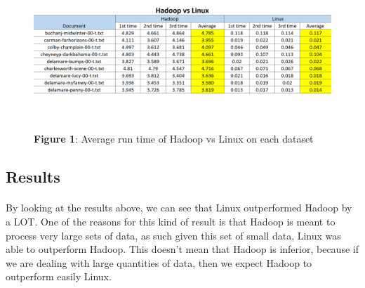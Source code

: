 \documentclass[12pt]{article}
\begin{document}
	\begin{figure}[H]
	\centering
	\includegraphics[width=160mm, height=60mm, scale=1.0]{images/Hadoop_vs_Linux_table.PNG}
	\caption*{\textbf{Figure 1}: Average run time of Hadoop vs Linux on each dataset}
	\end{figure}

	\subsection{Results}
        \paragraph{} By looking at the results above, we can see that Linux outperformed Hadoop 
		by a LOT. One of the reasons for this kind of result is that Hadoop is meant to process 
		very large sets of data, as such given this set of small data, Linux was able to outperform 
		Hadoop. This doesn't mean that Hadoop is inferior, because if we are dealing with large quantities 
		of data, then we expect Hadoop to outperform easily Linux.
        \bigskip
\end{document}
